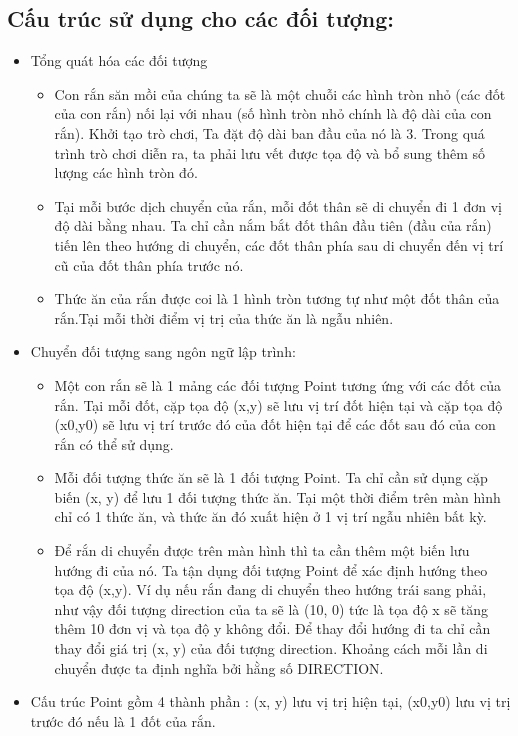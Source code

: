 \documentclass[13pt,a4paper]{article}
\begin{document}
\subsection{Cấu trúc sử dụng cho các đối tượng:}
\begin{itemize}
    \item Tổng quát hóa các đối tượng
    \begin{itemize}
        \item Con rắn săn mồi của chúng ta sẽ là một chuỗi các hình tròn nhỏ (các đốt của con rắn) nối lại với nhau (số hình tròn nhỏ chính là độ dài của con rắn). Khởi tạo trò chơi, Ta đặt độ dài ban đầu của nó là 3. Trong quá trình trò chơi diễn ra, ta phải lưu vết được tọa độ và bổ sung thêm số lượng các hình tròn đó.
        \item  Tại mỗi bước dịch chuyển của rắn, mỗi đốt thân sẽ di chuyển đi 1 đơn vị độ dài bằng nhau. Ta chỉ cần nắm bắt đốt thân đầu tiên (đầu của rắn) tiến lên theo hướng di chuyển, các  đốt thân phía sau di chuyển đến vị trí cũ của đốt thân phía trước nó.
        \item Thức ăn của rắn được coi là 1 hình tròn tương tự như một đốt thân của rắn.Tại mỗi thời điểm vị trị của thức ăn là ngẫu nhiên.
    \end{itemize}

\item Chuyển đối tượng sang ngôn ngữ lập trình:
\begin{itemize}
    \item Một con rắn sẽ là 1 mảng các đối tượng Point tương ứng với các đốt của rắn. Tại mỗi đốt, cặp tọa độ (x,y) sẽ lưu vị trí đốt hiện tại và cặp tọa độ (x0,y0) sẽ lưu vị trí trước đó của đốt hiện tại để các đốt sau đó của con rắn có thể sử dụng.
    \item Mỗi đối tượng thức ăn sẽ là 1 đối tượng Point. Ta chỉ cần sử dụng cặp biến (x, y) để lưu 1 đối tượng thức ăn. Tại một thời điểm trên màn hình chỉ có 1 thức ăn, và thức ăn đó xuất hiện ở 1 vị trí ngẫu nhiên bất kỳ.
    \item Để rắn di chuyển được trên màn hình thì ta cần thêm một biến lưu hướng đi của nó. Ta tận dụng đối tượng Point để xác định hướng theo tọa độ (x,y). Ví dụ nếu rắn đang di chuyển theo hướng trái sang phải, như vậy đối tượng direction của ta sẽ là (10, 0) tức là tọa độ x sẽ tăng thêm 10 đơn vị và tọa độ y không đổi. Để thay đổi hướng đi  ta chỉ cần thay đổi giá trị (x, y) của đối tượng direction. Khoảng cách mỗi lần di chuyển được ta định nghĩa bởi hằng số DIRECTION. 
\end{itemize}

\item	Cấu trúc Point gồm 4 thành phần : (x, y) lưu vị trị hiện tại, (x0,y0) lưu vị trị trước đó nếu là 1 đốt của rắn.
\end{itemize}
\end{document}
